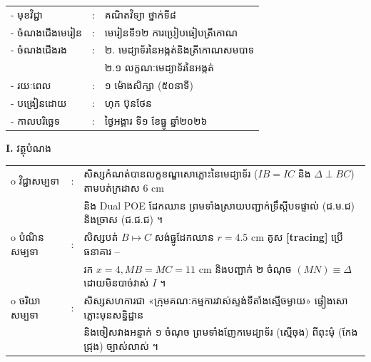 \documentclass[a4paper,10pt]{article}
\newcommand{\wcirc}{{\CourierBullet\fontsize{9.5pt}{11pt}\selectfont o}}
\newcommand{\cnum}[1]{{\fontsize{10.5pt}{12pt}\selectfont\ding{\numexpr181+#1\relax}}\hspace{0.2em}}
\begin{document}
{\renewcommand{\arraystretch}{1.05}
\hspace*{4.05cm}%
\begin{tabular}{@{}l l l@{}}
  - \hspace{0.35cm} មុខវិជ្ជា & : & គណិតវិទ្យា ថ្នាក់ទី៨ \\
  - \hspace{0.35cm} ចំណងជើងមេរៀន & : & មេរៀនទី១២ ការប្រៀបធៀបត្រីកោណ \\
  - \hspace{0.35cm} ចំណងជើងរង & : & ២. មេដ្យាទ័រនៃអង្កត់និងត្រីកោណសមបាទ \\
  & & ២.១ លក្ខណៈមេដ្យាទ័រនៃអង្កត់ \\
  - \hspace{0.35cm} រយៈពេល & : & ១ ម៉ោងសិក្សា (៥០នាទី) \\
  - \hspace{0.35cm} បង្រៀនដោយ & : & ហុក ប៊ុនថែន \\
  - \hspace{0.35cm} កាលបរិច្ឆេទ & : & ថ្ងៃអង្គារ ទី១ ខែធ្នូ ឆ្នាំ២០២៦ \\
\end{tabular}

\vspace{2pt}

\textbf{I.} {\muol វត្ថុបំណង}\\[2pt]
\hspace*{0.55cm}%
\begin{tabular}{@{}l l l@{}}
  \wcirc \hspace{0.25cm} វិជ្ជាសម្បទា & : & សិស្សកំណត់បានលក្ខខណ្ឌសោភ្លោះនៃមេដ្យាទ័រ ($IB=IC$ និង $\Delta\perp BC$) តាមបត់ក្រដាស $6\text{ cm}$ \\
  & & និង Dual POE ដែកឈាន ព្រមទាំងស្រាយបញ្ជាក់ទ្រឹស្ដីបទផ្ទាល់ (ជ.ម.ជ) និងច្រាស (ជ.ជ.ជ) ។ \\
  \wcirc \hspace{0.25cm} បំណិនសម្បទា & : & សិស្សបត់ $B\mapsto C$ សង់ធ្នូដែកឈាន $r=4.5\text{ cm}$ គូស \textbf{[tracing]} ប្រើធនាគារ \cnum{1}--\cnum{5} \\
  & & រក $x=4, MB=MC=11\text{ cm}$ និងបញ្ជាក់ ២ ចំណុច $(MN)\equiv\Delta$ ដោយមិនបាច់វាស់ $I$ ។ \\
  \wcirc \hspace{0.25cm} ចរិយាសម្បទា & : & សិស្សសហការជា «ក្រុមគណៈកម្មការវាស់ស្ទង់ទីតាំងស្មើចម្ងាយ» ផ្ទៀងសោភ្លោះមុនសន្និដ្ឋាន \\
  & & និងចៀសវាងអន្ទាក់ ១ ចំណុច ព្រមទាំងញែកមេដ្យាទ័រ (ស្មើចុង) ពីពុះមុំ (កែងជ្រុង) ច្បាស់លាស់ ។ \\
\end{tabular}

}
\end{document}
